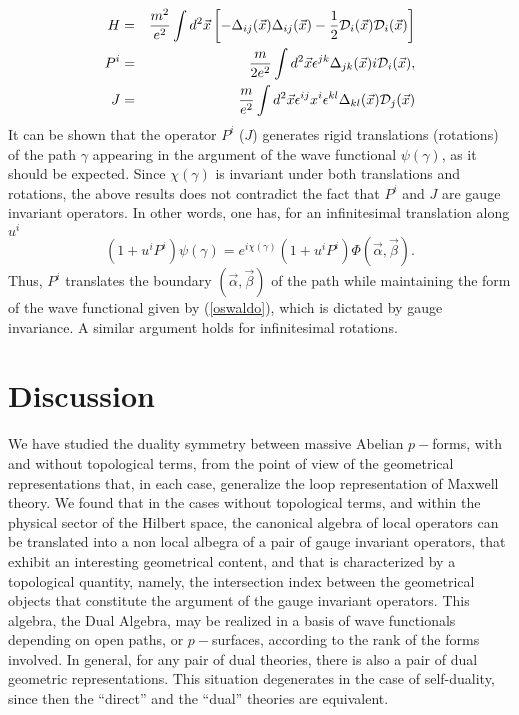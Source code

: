 \documentclass[a4paper,12pt]{article}
\newcommand{\eref}[1]{(\ref{#1})}
\begin{document}
\begin{eqnarray}
H&=&\frac{m^2}{e^2}\int d^2\vec x\left[-\Delta_{ij}(\vec x)\Delta_{ij}(\vec x)
-\frac 12{\cal D}_i(\vec x){\cal D}_i(\vec x)\right]\label{Real-H}\\
P^i&=&\frac{m}{2e^2}\int d^2\vec x\epsilon^{jk}\Delta_{jk}(\vec x)i{\cal D}_i(\vec x),\\
J&=&\frac{m}{e^2}\int d^2\vec
x\epsilon^{ij}x^i\epsilon^{kl}\Delta_{kl}(\vec x){\cal D}_j(\vec
x)
\end{eqnarray}
It can be shown that the operator $P^i$ ($J$) generates rigid
translations (rotations) of the path $\gamma$ appearing in the
argument of the wave functional $\psi(\gamma)$, as it should be
expected. Since $\chi(\gamma)$ is invariant under both
translations and rotations, the above results does not contradict
the fact that $P^i$ and $J$ are gauge invariant operators. In
other words, one has, for an infinitesimal translation along $u^i$
\begin{equation}
\left(1+u^iP^i\right)\psi(\gamma)=e^{i\chi(\gamma)}
\left(1+u^iP^i\right)\Phi(\vec\alpha,\vec\beta).
\end{equation}
Thus, $P^i$ translates the boundary $(\vec\alpha,\vec\beta)$ of
the path while maintaining the form of the wave functional given
by \eref{oswaldo}, which is dictated by gauge invariance. A
similar argument holds for infinitesimal rotations.


\section{Discussion}
We have studied the duality symmetry between massive Abelian
$p-$forms, with and without topological terms, from the point of
view of the geometrical representations that, in each case,
generalize the loop representation of Maxwell theory. We found
that in the cases without topological terms, and within the
physical sector of the Hilbert space, the canonical algebra of
local operators can be translated into a non local albegra of a
pair of gauge invariant operators, that exhibit an interesting
geometrical content, and that is characterized by a topological
quantity, namely, the intersection index between the geometrical
objects that constitute the argument of the gauge invariant
operators. This algebra, the Dual Algebra, may be realized in a
basis of wave functionals depending on open paths, or
$p-$surfaces, according to the rank of the forms involved. In
general, for any pair of dual theories, there is also a pair of
dual geometric representations. This situation degenerates in the
case of self-duality, since then the ``direct'' and the ``dual''
theories are equivalent.
\end{document}
